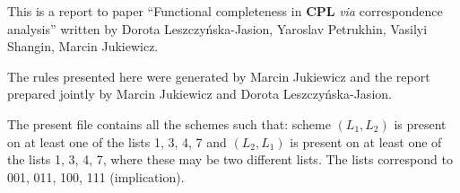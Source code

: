 \documentclass[11pt]{article}
\begin{document}
	
	This is a report to paper ``Functional completeness in \textbf{CPL} \textit{via} correspondence analysis'' written by Dorota Leszczy\'{n}ska-Jasion, 
	Yaroslav Petrukhin, Vasilyi Shangin, Marcin Jukiewicz. 
	
	The rules presented here were generated by Marcin Jukiewicz and the report prepared jointly by Marcin Jukiewicz and Dorota Leszczy\'{n}ska-Jasion.
	
	The present file contains all the schemes such that: scheme $(L_1, L_2)$ is present on at least one of the lists 1, 3, 4, 7 and $(L_2, L_1)$ is present on at least one of the lists 1, 3, 4, 7, where these may be two different lists. The lists correspond to 001, 011, 100, 111 (implication).
	
	\bigskip
\begin{center}


\end{center}
\end{document}
